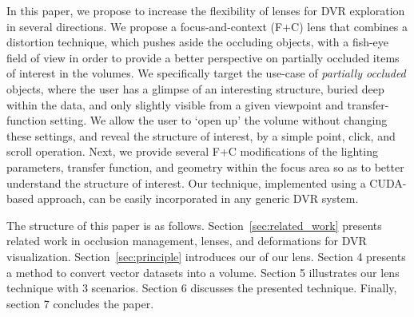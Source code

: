 In this paper, we propose to increase the flexibility of lenses for DVR exploration in several directions. We propose a focus-and-context (F+C) lens that combines a distortion technique, which pushes aside the occluding objects, with a fish-eye field of view in order to provide a better perspective on partially occluded items of interest in the volumes. We specifically target the use-case of \emph{partially occluded} objects, where the user has a glimpse of an interesting structure, buried deep within the data, and only slightly visible from a given viewpoint and transfer-function setting. We allow the user to `open up' the volume without changing these settings, and reveal the structure of interest, by a simple point, click, and scroll operation. Next, we provide several F+C modifications of the lighting parameters, transfer function, and geometry within the focus area so as to better understand the structure of interest. Our technique, implemented using a CUDA-based approach, can be easily incorporated in any generic DVR system.
 



The structure of this paper is as follows. Section~\ref{sec:related_work} presents related work in occlusion management, lenses, and deformations for DVR visualization. Section~\ref{sec:principle} introduces our of our lens. Section 4 presents a method to convert vector datasets into a volume. Section 5 illustrates our lens technique with 3 scenarios. Section 6 discusses the presented technique. Finally, section 7 concludes the paper. 
